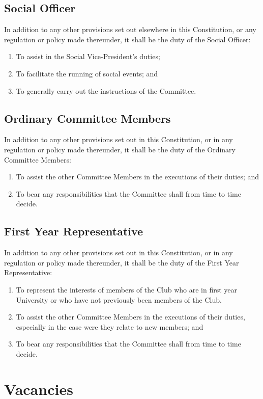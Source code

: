\documentclass[11pt]{article} %
\begin{document}
\subsection{Social Officer}
In addition to any other provisions set out elsewhere in this Constitution, or any regulation or policy made thereunder, it shall be the duty of the Social Officer:
\begin{enumerate}
	\item To assist in the Social Vice-President's duties;
	\item To facilitate the running of social events; and
	\item To generally carry out the instructions of the Committee.
\end{enumerate}

\subsection{Ordinary Committee Members}
In addition to any other provisions set out in this Constitution, or in any regulation or policy made thereunder, it shall be the duty of the Ordinary Committee Members:
\begin{enumerate}
	\item To assist the other Committee Members in the executions of their duties; and
	\item To bear any responsibilities that the Committee shall from time to time decide.
\end{enumerate}

\subsection{First Year Representative}
In addition to any other provisions set out in this Constitution, or in any regulation or policy made thereunder, it shall be the duty of the First Year Representative:
\begin{enumerate}
	\item To represent the interests of members of the Club who are in first year University or who have not previously been members of the Club.
	\item To assist the other Committee Members in the executions of their duties, especially in the case were they relate to new members; and
	\item To bear any responsibilities that the Committee shall from time to time decide.
\end{enumerate}

\section{Vacancies}
\end{document}
